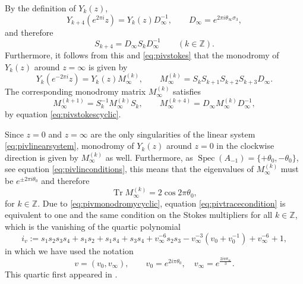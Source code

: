 \documentclass[a4paper,reqno]{amsart}
\numberwithin{equation}{section}
\numberwithin{equation}{section}
\begin{document}
By the definition of $Y_k(z)$,
\begin{equation*}
    Y_{k+4}(e^{2\pi i}z)=Y_k(z)D_\infty^{-1},\qquad D_\infty=e^{2\pi i \theta_\infty \sigma_3},
\end{equation*}
and therefore
\begin{equation}\label{eq:pivstokescyclic}
    S_{k+4}=D_\infty S_k D_\infty^{-1}\qquad (k\in\mathbb{Z}).
\end{equation}
Furthermore, it follows from this and \eqref{eq:pivstokes} that the monodromy of $Y_k(z)$ around $z=\infty$ is given by
\begin{equation*}
      Y_k(e^{-2\pi i}z)=Y_k(z)M_\infty^{(k)},\qquad M_\infty^{(k)}=S_kS_{k+1}S_{k+2}S_{k+3} D_\infty.  
\end{equation*}
The corresponding monodromy matrix $M_\infty^{(k)}$ satisfies
\begin{equation}\label{eq:pivmonodromycyclic}
    M_\infty^{(k+1)}=S_k^{-1} M_\infty^{(k)} S_k,\qquad
    M_\infty^{(k+4)}=D_\infty M_\infty^{(k)} D_\infty^{-1},
\end{equation}
by equation \eqref{eq:pivstokescyclic}.

Since $z=0$ and $z=\infty$ are the only singularities of the linear system \eqref{eq:pivlinearsystem}, monodromy of $Y_k(z)$ around $z=0$ in the clockwise direction is given by $M_\infty^{(k)}$ as well. 
Furthermore, as $\operatorname{Spec}(A_{-1})=\{+\theta_0,-\theta_0\}$, see equation \eqref{eq:pivlinconditions}, this means that the eigenvalues of $M_\infty^{(k)}$ must be $e^{\pm 2\pi i \theta_0}$ and therefore
\begin{equation}\label{eq:pivtracecondition}
    \operatorname{Tr}M_\infty^{(k)}=2\cos 2\pi \theta_0,
\end{equation}
for $k\in\mathbb{Z}$. 
Due to \eqref{eq:pivmonodromycyclic}, equation \eqref{eq:pivtracecondition} is equivalent to one and the same condition on the Stokes multipliers for all $k\in\mathbb{Z}$, which is the vanishing of the quartic polynomial
\begin{equation} \label{eq:pivquarticpolynomiali1}
    i_v:=s_1 s_2 s_3 s_4  +s_1 s_2+s_1 s_4+s_3 s_4+v_{\infty }^{-6} s_2 s_3 - v_{\infty }^{-3}(v_0+v_0^{-1})+ v_{\infty }^{-6}+1,
\end{equation}
in which we have used the notation
\begin{equation}\label{eq:defiv0vinfPIV}
    v= (v_0,v_{\infty}),\qquad v_0=e^{2 i \pi \theta_0},\quad v_\infty=e^{\frac{2 i \pi \theta_\infty}{3}}.
\end{equation}
This quartic first appeared in \cite[Eq. (2.27)]{fokaszhou}.
\end{document}
